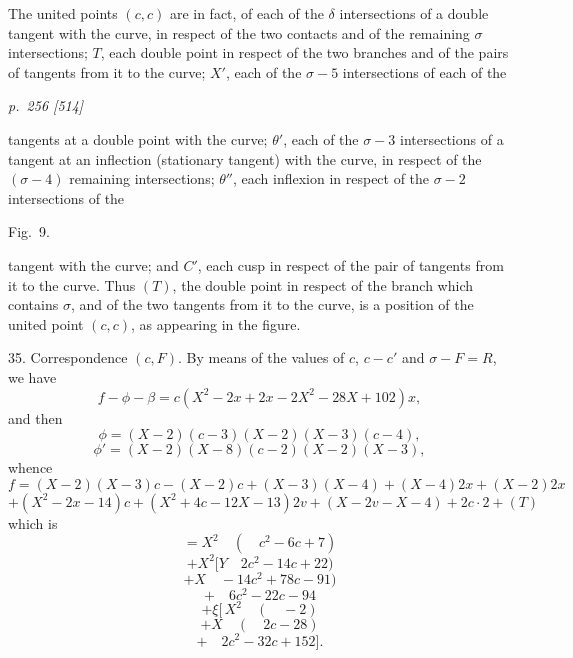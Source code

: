 \documentclass[11pt,a4paper]{article}
\theoremstyle{plain}
\theoremstyle{definition}
\begin{document}
The united points $(c, c)$ are in fact, of each of the $\delta$ intersections of a double tangent with the curve, in respect of the two contacts and of the remaining $\sigma$
intersections; $T$, each double point in respect of the two branches and of the pairs
of tangents from it to the curve; $X'$, each of the $\sigma - 5$ intersections of each of the

\clearpage

\bigskip
\textit{p.~256 [514]}
\smallskip

\noindent
tangents at a double point with the curve; $\theta'$, each of the $\sigma - 3$ intersections of a
tangent at an inflection (stationary tangent) with the curve, in respect of the $(\sigma - 4)$
remaining intersections; $\theta''$, each inflexion in respect of the $\sigma - 2$ intersections of the

\begin{center}
Fig.\ 9.\\
\end{center}

tangent with the curve; and $C'$, each cusp in respect of the pair of tangents from
it to the curve.  Thus $(T)$, the double point in respect of the branch which contains $\sigma$,
and of the two tangents from it to the curve, is a position of the united point
$(c, c)$, as appearing in the figure.

35.  Correspondence $(c, F)$.  By means of the values of $c$, $c - c'$ and $\sigma - F = R$,
we have
\[
f - \phi - \beta = c(X^2 - 2x + 2x - 2X^2 - 28X + 102)x,
\]
and then
\[
\phi = (X - 2)(c - 3)(X - 2)(X - 3)(c - 4),
\]
\[
\phi' = (X - 2)(X - 8)(c - 2)(X - 2)(X - 3),
\]
whence
\[
f = (X - 2)(X - 3)c - (X - 2)c + (X - 3)(X - 4) + (X - 4)2x + (X - 2)2x
\]
\[
+ (X^2 - 2x - 14)c + (X^2 + 4c - 12X - 13)2v + (X - 2v - X - 4) + 2c \cdot 2 + (T)
\]
which is
\[
= X^2 \quad ( \quad c^2 - 6c + 7)
\]
\[
+ X^2[Y \quad 2c^2 - 14c + 22)
\]
\[
+ X \quad -14c^2 + 78c - 91)
\]
\[
+ \quad 6c^2 - 22c - 94
\]
\[
+ \xi [\,X^2 \quad (\quad - 2)
\]
\[
+ X \quad ( \quad 2c - 28)
\]
\[
+ \quad 2c^2 - 32c + 152].
\]
\end{document}
